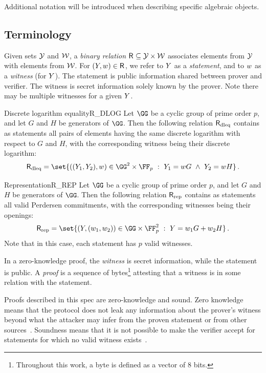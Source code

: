 \documentclass[11pt]{article}
\begin{document}
Additional notation will be introduced when describing specific algebraic objects.
\subsection{Terminology}
Given sets $\Set{Y}$ and $\Set{W}$,
a \emph{binary relation} $\relation \subseteq \Set{Y} \times \Set{W}$ associates elements from $\Set{Y}$ with elements from $\Set{W}$.
For $(\statement,\witness)\in\relation$, we refer to $\statement$ as a \emph{statement}, and to $\witness$ as a \emph{witness} (for $\statement$).
The statement is public information shared between prover and verifier.
The witness is secret information solely known by the prover.
Note there may be multiple witnesses for a given $\statement$.

\begin{example}{Discrete logarithm equality}{R_DLOG}
  Let $\GG$ be a cyclic group of prime order $p$, and let $G$ and $H$ be generators of $\GG$.
	Then the following relation $\relation[dleq]$ contains as statements all pairs of elements having the same discrete logarithm with respect to $G$ and $H$, with the corresponding witness being their discrete logarithm:
  $$
	  \relation[dleq] = \set{\left((\statement_1,\statement_2),\witness\right) \in \GG^2\times \FF_p~:~\statement_1=\witness G ~\land~ \statement_2=\witness H}\,.
	$$
\end{example}

\begin{example}{Representation}{R_REP}
  Let $\GG$ be a cyclic group of prime order $p$, and let $G$ and $H$ be generators of $\GG$.
	Then the following relation $\relation[rep]$ contains as statements all valid Perdersen commitments, with the corresponding witnesses being their openings:
  $$
	  \relation[rep] = \set{\left(\statement,(\witness_1,\witness_2)\right)\in \GG \times \FF_p^2~:~\statement=\witness_1G + \witness_2H}\,.
	$$
	Note that in this case, each statement has $p$ valid witnesses.
\end{example}

In a zero-knowledge proof, the \emph{witness} is secret information, while the statement is public.
A \emph{proof} is a sequence of bytes\footnote{Throughout this work, a byte is defined as a vector of 8 bits.} attesting that a witness is in some relation with the statement.

Proofs described in this spec are zero-knowledge and sound.
Zero knowledge means that the protocol does not leak any information about the prover's witness beyond what the attacker may infer from the proven statement or from other sources~\cite[1.6.4]{zkproof-reference}.
Soundness means that it is not possible to make the verifier accept for statements for which no valid witness exists~\cite[1.6.2]{zkproof-reference}.
\end{document}
